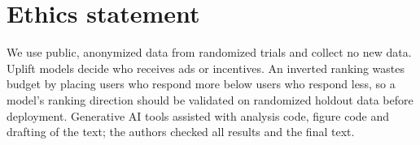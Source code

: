 \documentclass[sigconf,anonymous,review]{acmart}
\begin{document}
\section*{Ethics statement}
We use public, anonymized data from randomized trials and collect no new data. Uplift models decide who receives ads or incentives. An inverted ranking wastes budget by placing users who respond more below users who respond less, so a model's ranking direction should be validated on randomized holdout data before deployment. Generative AI tools assisted with analysis code, figure code and drafting of the text; the authors checked all results and the final text.



\end{document}
